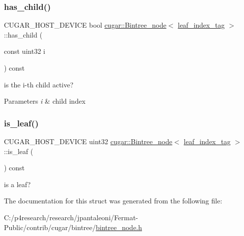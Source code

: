 \subsubsection{\texorpdfstring{has\+\_\+child()}{has\_child()}}
{\footnotesize\ttfamily C\+U\+G\+A\+R\+\_\+\+H\+O\+S\+T\+\_\+\+D\+E\+V\+I\+CE bool \hyperlink{structcugar_1_1_bintree__node}{cugar\+::\+Bintree\+\_\+node}$<$ \hyperlink{structcugar_1_1leaf__index__tag}{leaf\+\_\+index\+\_\+tag} $>$\+::has\+\_\+child (\begin{DoxyParamCaption}\item[{const uint32}]{i }\end{DoxyParamCaption}) const\hspace{0.3cm}{\ttfamily [inline]}}

is the i-\/th child active?


\begin{DoxyParams}{Parameters}
{\em i} & child index \\
\hline
\end{DoxyParams}
\mbox{\label{structcugar_1_1_bintree__node_3_01leaf__index__tag_01_4_a71208aedba4f65bc0c2002926ab78d85}} 
\subsubsection{\texorpdfstring{is\+\_\+leaf()}{is\_leaf()}}
{\footnotesize\ttfamily C\+U\+G\+A\+R\+\_\+\+H\+O\+S\+T\+\_\+\+D\+E\+V\+I\+CE uint32 \hyperlink{structcugar_1_1_bintree__node}{cugar\+::\+Bintree\+\_\+node}$<$ \hyperlink{structcugar_1_1leaf__index__tag}{leaf\+\_\+index\+\_\+tag} $>$\+::is\+\_\+leaf (\begin{DoxyParamCaption}{ }\end{DoxyParamCaption}) const\hspace{0.3cm}{\ttfamily [inline]}}

is a leaf? 

The documentation for this struct was generated from the following file\+:\begin{DoxyCompactItemize}
\item 
C\+:/p4research/research/jpantaleoni/\+Fermat-\/\+Public/contrib/cugar/bintree/\hyperlink{bintree__node_8h}{bintree\+\_\+node.\+h}\end{DoxyCompactItemize}
